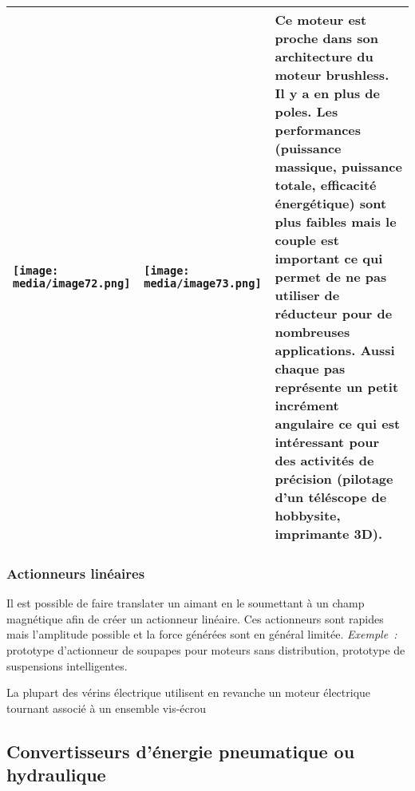 \documentclass[
]{article}
\begin{document}
\begin{longtable}[]{@{}lll@{}}
\toprule
\endhead
\texttt{[image: media/image72.png]} &
\texttt{[image: media/image73.png]} & Ce
moteur est proche dans son architecture du moteur brushless. Il y a en
plus de poles. Les performances (puissance massique, puissance totale,
efficacité énergétique) sont plus faibles mais le couple est important
ce qui permet de ne pas utiliser de réducteur pour de nombreuses
applications. Aussi chaque pas représente un petit incrément angulaire
ce qui est intéressant pour des activités de précision (pilotage d'un
téléscope de hobbysite, imprimante 3D). \\
\bottomrule
\end{longtable}

\hypertarget{actionneurs-linuxe9aires}{%
\subsubsection{Actionneurs linéaires}\label{actionneurs-linuxe9aires}}

Il est possible de faire translater un aimant en le soumettant à un
champ magnétique afin de créer un actionneur linéaire. Ces actionneurs
sont rapides mais l'amplitude possible et la force générées sont en
général limitée. \emph{Exemple~:} prototype d'actionneur de soupapes
pour moteurs sans distribution, prototype de suspensions intelligentes.

La plupart des vérins électrique utilisent en revanche un moteur
électrique tournant associé à un ensemble vis-écrou

\hypertarget{convertisseurs-duxe9nergie-pneumatique-ou-hydraulique}{%
\subsection{Convertisseurs d'énergie pneumatique ou
hydraulique}\label{convertisseurs-duxe9nergie-pneumatique-ou-hydraulique}}
\end{document}
